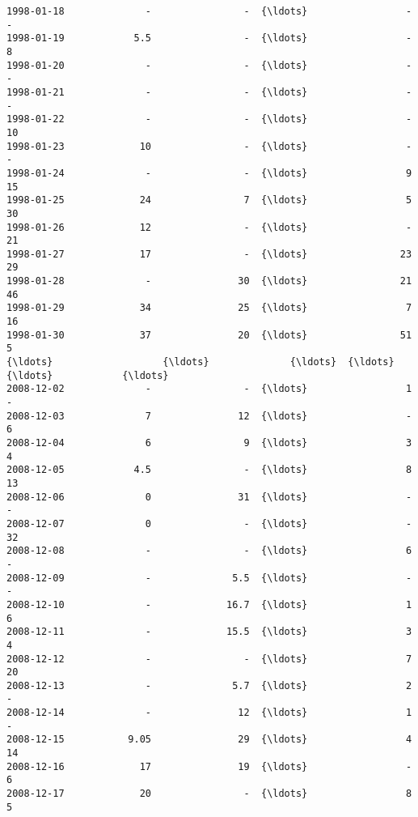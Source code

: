 \documentclass[11pt]{article}
\begin{document}
\begin{tcolorbox}[breakable, size=fbox, boxrule=.5pt, pad at break*=1mm, opacityfill=0]
\begin{Verbatim}[commandchars=\\\{\}]
1998-01-18              -                -  {\ldots}                 -              -
1998-01-19            5.5                -  {\ldots}                 -              8
1998-01-20              -                -  {\ldots}                 -              -
1998-01-21              -                -  {\ldots}                 -              -
1998-01-22              -                -  {\ldots}                 -             10
1998-01-23             10                -  {\ldots}                 -              -
1998-01-24              -                -  {\ldots}                 9             15
1998-01-25             24                7  {\ldots}                 5             30
1998-01-26             12                -  {\ldots}                 -             21
1998-01-27             17                -  {\ldots}                23             29
1998-01-28              -               30  {\ldots}                21             46
1998-01-29             34               25  {\ldots}                 7             16
1998-01-30             37               20  {\ldots}                51              5
{\ldots}                   {\ldots}              {\ldots}  {\ldots}               {\ldots}            {\ldots}
2008-12-02              -                -  {\ldots}                 1              -
2008-12-03              7               12  {\ldots}                 -              6
2008-12-04              6                9  {\ldots}                 3              4
2008-12-05            4.5                -  {\ldots}                 8             13
2008-12-06              0               31  {\ldots}                 -              -
2008-12-07              0                -  {\ldots}                 -             32
2008-12-08              -                -  {\ldots}                 6              -
2008-12-09              -              5.5  {\ldots}                 -              -
2008-12-10              -             16.7  {\ldots}                 1              6
2008-12-11              -             15.5  {\ldots}                 3              4
2008-12-12              -                -  {\ldots}                 7             20
2008-12-13              -              5.7  {\ldots}                 2              -
2008-12-14              -               12  {\ldots}                 1              -
2008-12-15           9.05               29  {\ldots}                 4             14
2008-12-16             17               19  {\ldots}                 -              6
2008-12-17             20                -  {\ldots}                 8              5

\end{Verbatim}
\end{tcolorbox}
\end{document}
